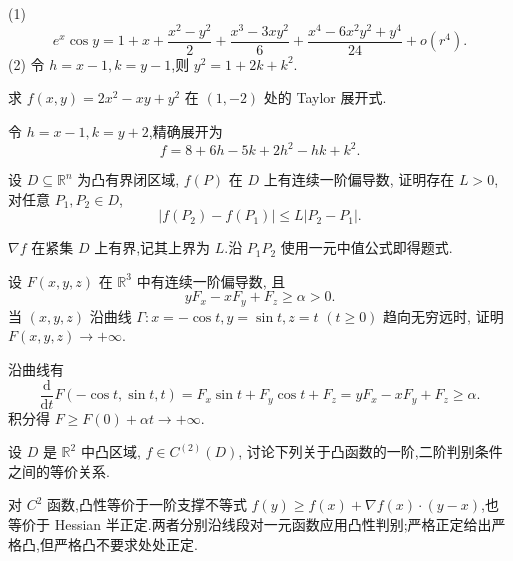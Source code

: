 \begin{solution}

    (1)
    \[
        e^x\cos y=1+x+\dfrac{x^2-y^2}{2}+\dfrac{x^3-3xy^2}{6}
        +\dfrac{x^4-6x^2y^2+y^4}{24}+o(r^4).
    \]
    (2) 令 $h=x-1,k=y-1$,则 $y^2=1+2k+k^2$.
\end{solution}

\begin{example}
    求 $f(x,y)=2x^2-xy+y^2$ 在 $(1,-2)$ 处的 Taylor 展开式.
\end{example}
\exampleblank

\begin{solution}
    令 $h=x-1,k=y+2$,精确展开为
    \[
        f=8+6h-5k+2h^2-hk+k^2.
    \]
\end{solution}

\begin{example}
    设 $D\subseteq\mathbb{R}^n$ 为凸有界闭区域, $f(P)$ 在 $D$ 上有连续一阶偏导数, 证明存在 $L>0$, 对任意 $P_1,P_2\in D$,
    \[
        |f(P_2)-f(P_1)|\leq L|P_2-P_1|.
    \]
\end{example}
\exampleblank

\begin{solution}
    $\nabla f$ 在紧集 $D$ 上有界,记其上界为 $L$.沿 $P_1P_2$ 使用一元中值公式即得题式.
\end{solution}

\begin{example}
    设 $F(x,y,z)$ 在 $\mathbb{R}^3$ 中有连续一阶偏导数, 且
    \[
        yF_x-xF_y+F_z\geq\alpha>0.
    \]
    当 $(x,y,z)$ 沿曲线 $\Gamma:x=-\cos t,y=\sin t,z=t$ $(t\geq0)$ 趋向无穷远时, 证明 $F(x,y,z)\to+\infty$.
\end{example}
\exampleblank

\begin{solution}
    沿曲线有
    \[
        \dfrac{\mathrm d}{\mathrm dt}F(-\cos t,\sin t,t)=F_x\sin t+F_y\cos t+F_z
        =yF_x-xF_y+F_z\geq\alpha.
    \]
    积分得 $F\geq F(0)+\alpha t\to+\infty$.
\end{solution}

\begin{example}
    设 $D$ 是 $\mathbb{R}^2$ 中凸区域, $f\in C^{(2)}(D)$, 讨论下列关于凸函数的一阶,二阶判别条件之间的等价关系.
\end{example}
\exampleblank

\begin{solution}
    对 $C^2$ 函数,凸性等价于一阶支撑不等式 $f(y)\geq f(x)+\nabla f(x)\cdot(y-x)$,也等价于 Hessian 半正定.两者分别沿线段对一元函数应用凸性判别;严格正定给出严格凸,但严格凸不要求处处正定.
\end{solution}


